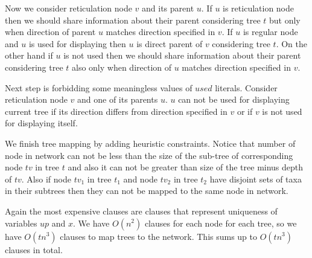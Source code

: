 \documentclass[runningheads, envcountsame, a4paper]{llncs}
\begin{document}
Now we consider reticulation node $v$ and its parent $u$. If $u$ is reticulation node then we should share information 
about their parent considering tree $t$ but only when direction of parent $u$ matches direction specified in $v$. 
If $u$ is regular node and $u$ is used for displaying then $u$ is direct parent of $v$ considering tree $t$.
On the other hand if $u$ is not used then we should share information about their parent considering tree $t$ also 
only when direction of $u$ matches direction specified in $v$.

Next step is forbidding some meaningless values of $used$ literals. Consider reticulation node $v$ and one of its parents $u$. 
$u$ can not be used for displaying current tree if its direction differs from direction specified in $v$ or if $v$ is 
not used for displaying itself.

We finish tree mapping by adding heuristic constraints. Notice that number of node in network can not be less than the 
size of the sub-tree of corresponding node $tv$ in tree $t$ and also it can not be greater than size of the tree minus 
depth of $tv$. Also if node $tv_1$ in tree $t_1$ and node $tv_2$ in tree $t_2$ have disjoint sets of taxa in their 
subtrees then they can not be mapped to the same node in network.

Again the most expensive clauses are clauses that represent uniqueness of variables $up$ and $x$. We have $O(n^2)$ clauses for
each node for each tree, so we have $O(tn^3)$ clauses to map trees to the network. This sums up to $O(tn^3)$ clauses in total.
\end{document}
